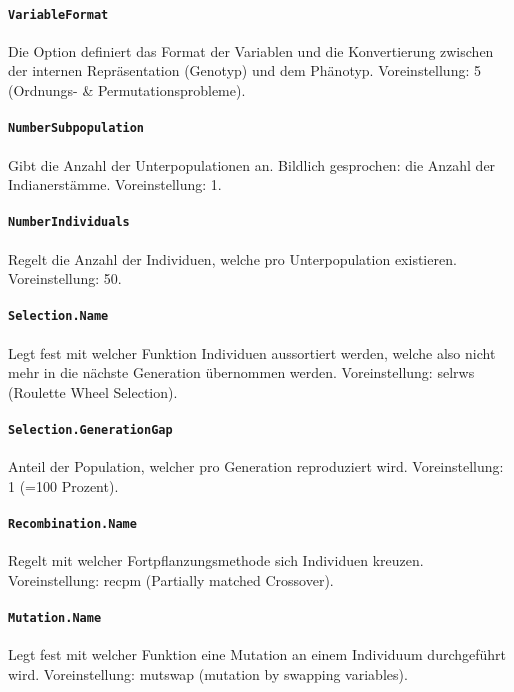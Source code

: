 
\paragraph{{\tt VariableFormat}} Die Option definiert das Format der Variablen
und die Konvertierung zwischen der internen Repräsentation (Genotyp) und dem
Phänotyp.
Voreinstellung: 5 (Ordnungs- \& Permutationsprobleme).

\paragraph{{\tt NumberSubpopulation}} Gibt die Anzahl der Unterpopulationen an.
Bildlich gesprochen: die Anzahl der Indianerstämme.
Voreinstellung: 1.

\paragraph{{\tt NumberIndividuals}} Regelt die Anzahl
der Individuen, welche pro Unterpopulation existieren.
Voreinstellung: 50.

\paragraph{{\tt Selection.Name}} Legt fest mit welcher Funktion Individuen
aussortiert werden, welche also nicht mehr in die nächste Generation
übernommen werden.
Voreinstellung: selrws (Roulette Wheel Selection).

\paragraph{{\tt Selection.GenerationGap}} Anteil der Population, welcher pro
Generation reproduziert wird.
Voreinstellung: 1 (=100 Prozent).

\paragraph{{\tt Recombination.Name}} Regelt mit welcher Fortpflanzungsmethode
sich Individuen kreuzen.
Voreinstellung: recpm (Partially matched Crossover).

\paragraph{{\tt Mutation.Name}} Legt fest mit welcher Funktion eine Mutation
an einem Individuum durchgeführt wird.
Voreinstellung: mutswap (mutation by swapping variables).

